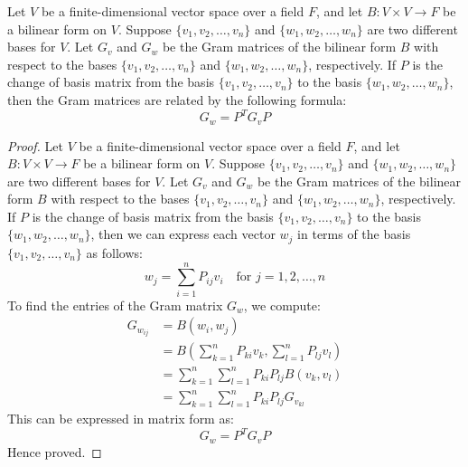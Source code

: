 \documentclass[openany]{book}
\begin{document}
\begin{mytheorem}
Let $V$ be a finite-dimensional vector space over a field $F$, and let $B: V \times V \to F$ be a bilinear form on $V$. Suppose $\{v_1, v_2, \ldots, v_n\}$ and $\{w_1, w_2, \ldots, w_n\}$ are two different bases for $V$. Let $G_v$ and $G_w$ be the Gram matrices of the bilinear form $B$ with respect to the bases $\{v_1, v_2, \ldots, v_n\}$ and $\{w_1, w_2, \ldots, w_n\}$, respectively. If $P$ is the change of basis matrix from the basis $\{v_1, v_2, \ldots, v_n\}$ to the basis $\{w_1, w_2, \ldots, w_n\}$, then the Gram matrices are related by the following formula:
$$G_w = P^T G_v P$$
\end{mytheorem}
\begin{proof}
Let $V$ be a finite-dimensional vector space over a field $F$, and let $B: V \times V \to F$ be a bilinear form on $V$. Suppose $\{v_1, v_2, \ldots, v_n\}$ and $\{w_1, w_2, \ldots, w_n\}$ are two different bases for $V$. Let $G_v$ and $G_w$ be the Gram matrices of the bilinear form $B$ with respect to the bases $\{v_1, v_2, \ldots, v_n\}$ and $\{w_1, w_2, \ldots, w_n\}$, respectively. If $P$ is the change of basis matrix from the basis $\{v_1, v_2, \ldots, v_n\}$ to the basis $\{w_1, w_2, \ldots, w_n\}$, then we can express each vector $w_j$ in terms of the basis $\{v_1, v_2, \ldots, v_n\}$ as follows:
$$w_j = \sum_{i=1}^n P_{ij} v_i \quad \text{for } j = 1, 2, \ldots, n$$
To find the entries of the Gram matrix $G_w$, we compute:
\[\begin{aligned}
G_{w_{ij}} &= B(w_i, w_j) \\
&= B\left(\sum_{k=1}^n P_{ki} v_k, \sum_{l=1}^n P_{lj} v_l\right) \\
&= \sum_{k=1}^n \sum_{l=1}^n P_{ki} P_{lj} B(v_k, v_l) \\
&= \sum_{k=1}^n \sum_{l=1}^n P_{ki} P_{lj} G_{v_{kl}}
\end{aligned}\]
This can be expressed in matrix form as:
$$G_w = P^T G_v P$$
Hence proved. 
\end{proof}
\end{document}
